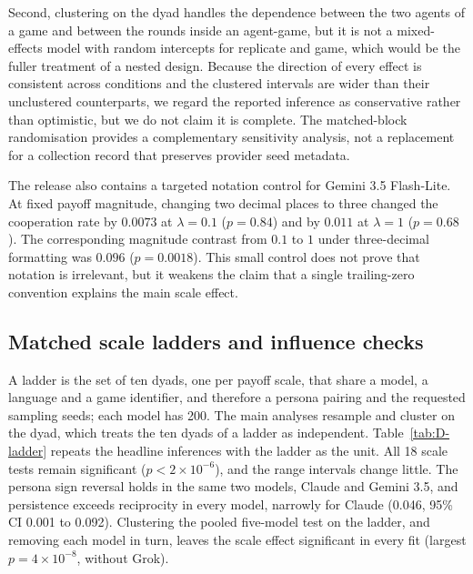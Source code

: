 \documentclass[11pt,a4paper]{article}
\newcommand{\rev}[1]{{\color{red}#1}}
\newcommand{\rev}[1]{#1}
\begin{document}
Second, clustering on the dyad handles the dependence between the two agents of a game and between the rounds inside an agent-game, but it is not a mixed-effects model with random intercepts for replicate and game, which would be the fuller treatment of a nested design. Because the direction of every effect is consistent across conditions and the clustered intervals are wider than their unclustered counterparts, we regard the reported inference as conservative rather than optimistic, but we do not claim it is complete. The matched-block randomisation provides a complementary sensitivity analysis, not a replacement for a collection record that preserves provider seed metadata.

The release also contains a targeted notation control for Gemini 3.5 Flash-Lite. At fixed payoff magnitude, changing two decimal places to three changed the cooperation rate by $0.0073$ at $\lambda=0.1$ ($p=0.84$) and by $0.011$ at $\lambda=1$ ($p=0.68$). The corresponding magnitude contrast from $0.1$ to $1$ under three-decimal formatting was $0.096$ ($p=0.0018$). This small control does not prove that notation is irrelevant, but it weakens the claim that a single trailing-zero convention explains the main scale effect.


\subsection{Matched scale ladders and influence checks}\label{appendix:robust_ladders}

\rev{A ladder is the set of ten dyads, one per payoff scale, that share a model, a language and a game identifier, and therefore a persona pairing and the requested sampling seeds; each model has 200. The main analyses resample and cluster on the dyad, which treats the ten dyads of a ladder as independent. Table~\ref{tab:D-ladder} repeats the headline inferences with the ladder as the unit. All 18 scale tests remain significant ($p < 2\times10^{-6}$), and the range intervals change little. The persona sign reversal holds in the same two models, Claude and Gemini 3.5, and persistence exceeds reciprocity in every model, narrowly for Claude (0.046, 95\% CI 0.001 to 0.092). Clustering the pooled five-model test on the ladder, and removing each model in turn, leaves the scale effect significant in every fit (largest $p = 4\times10^{-8}$, without Grok).}
\end{document}
